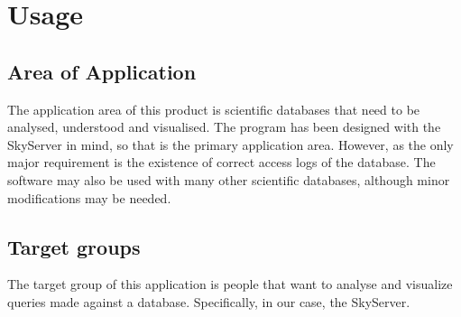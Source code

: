 \section{Usage}
\subsection{Area of Application}
The application area of this product is scientific \glspl{database} that need to be analysed, %
 understood and visualised.
The program has been designed with the \gls{SkyServer} in mind,
 so that is the primary application area.
However, as the only major requirement is the existence of correct access logs of the \gls{database}.
The software may also be used with many other scientific \glspl{database},
 although minor modifications may be needed.


%



\subsection{Target groups}

The target group of this application is people that want to analyse 
and visualize queries made against a \gls{database}. Specifically,
in our case, the \gls{SkyServer}.

